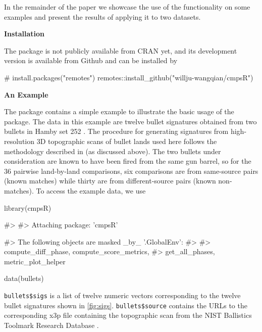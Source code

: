 In the remainder of the paper we showcase the use of the 
functionality on some examples and present the results of applying it to
two datasets.

\textbf{Installation}

The  package is not publicly available from CRAN yet, and its
development version is available from Github and can be installed by

\begin{Schunk}
\begin{Sinput}
# install.packages("remotes") 
remotes::install_github("willju-wangqian/cmpsR")
\end{Sinput}
\end{Schunk}

\textbf{An Example}

The  package contains a simple example to illustrate the
basic usage of the package. The data in this example are twelve bullet
signatures obtained from two bullets in Hamby set 252 \citep{hamby}. The
procedure for generating signatures from high-resolution 3D topographic
scans of bullet lands used here follows the methodology described in
\citet{aoas} (as discussed above). The two bullets under consideration
are known to have been fired from the same gun barrel, so for the 36
pairwise land-by-land comparisons, six comparisons are from same-source
pairs (known matches) while thirty are from different-source pairs
(known non-matches). To access the example data, we use

\begin{Schunk}
\begin{Sinput}
library(cmpsR)
\end{Sinput}
\begin{Soutput}
#> 
#> Attaching package: 'cmpsR'
\end{Soutput}
\begin{Soutput}
#> The following objects are masked _by_ '.GlobalEnv':
#> 
#>     compute_diff_phase, compute_score_metrics,
#>     get_all_phases, metric_plot_helper
\end{Soutput}
\begin{Sinput}
data(bullets)
\end{Sinput}
\end{Schunk}

\texttt{bullets\$sigs} is a list of twelve numeric vectors corresponding
to the twelve bullet signatures shown in \autoref{fig:sigs}.
\texttt{bullets\$source} contains the URLs to the corresponding x3p file
containing the topographic scan from the NIST Ballistics Toolmark
Research Database \citep{nistdb}.

